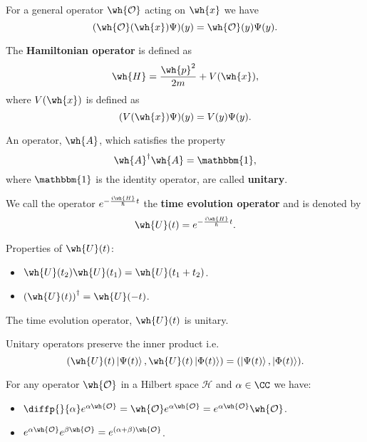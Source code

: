 \documentclass[12pt, a4paper]{article}
\begin{document}
\begin{mdthm}
    For a general operator \(\wh{\mathcal{O}}\) acting on \(\wh{x}\) we have
    \[(\wh{\mathcal{O}}(\wh{x}) \Psi)(y) = \wh{\mathcal{O}}(y)\Psi(y).\]
\end{mdthm}

\begin{definition}
    The \textbf{Hamiltonian operator} is defined as 
    \[\wh{H} = \frac{\wh{p}^2}{2m} + V(\wh{x}),\]
    where \(V(\wh{x})\) is defined as 
    \[(V(\wh{x})\Psi) (y) = V(y)\Psi(y).\]
\end{definition}

\begin{definition}
    An operator, \(\wh{A}\), which satisfies the property
    \[\wh{A}^{\dagger}\wh{A} = \mathbbm{1},\]
    where \(\mathbbm{1}\) is the identity operator, are called \textbf{unitary}.
\end{definition}

\begin{definition}
    We call the operator \(e^{-\frac{i\wh{H}}{\hbar}t}\) the \textbf{time evolution operator} and is denoted by 
    \[\wh{U}(t)=e^{-\frac{i\wh{H}}{\hbar}t}.\]
\end{definition}

\begin{theorem}
    Properties of \(\wh{U}(t)\):
    \begin{itemize}
        \item \(\wh{U}(t_2)\wh{U}(t_1)=\wh{U}(t_1+t_2)\).
        \item \(\left( \wh{U}(t) \right)^{\dagger} = \wh{U}(-t)\).
    \end{itemize}
\end{theorem}

\begin{theorem}
    The time evolution operator, \(\wh{U}(t)\) is unitary.
\end{theorem}

\begin{mdthm}
    Unitary operators preserve the inner product i.e.
    \[\left( \wh{U}(t) \ket{\Psi(t)},\wh{U}(t)\ket{\Phi(t)} \right) = (\ket{\Psi(t)},\ket{\Phi(t)}).\]
\end{mdthm}

\begin{mdthm}
    For any operator \(\wh{\mathcal{O}}\) in a Hilbert space \(\mathcal{H}\) and \(\alpha \in \CC\) we have:
    \begin{itemize}
        \item \(\diffp{}{\alpha}e^{\alpha \wh{\mathcal{O}}}= \wh{\mathcal{O}}e^{\alpha \wh{\mathcal{O}}} = e^{\alpha \wh{\mathcal{O}}}\wh{\mathcal{O}}\).
        \item \(e^{\alpha \wh{\mathcal{O}}} e^{\beta \wh{\mathcal{O}}} = e^{(\alpha+\beta) \wh{\mathcal{O}}}\).
    \end{itemize}
\end{mdthm}
\end{document}
